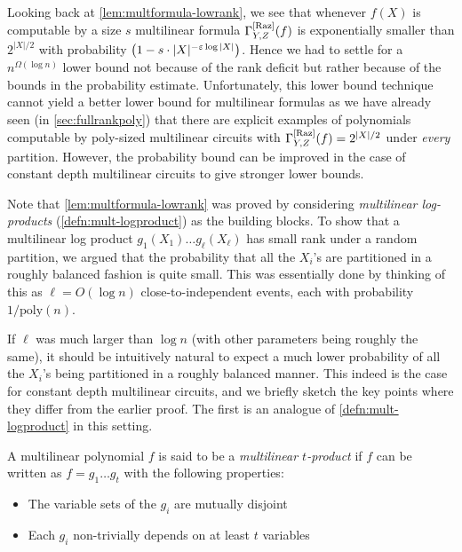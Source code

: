Looking back at \autoref{lem:multformula-lowrank}, we see that whenever $f(X)$ is computable by a size $s$ multilinear formula $\Gamma^{\mathrm{[Raz]}}_{Y,Z}(f)$ is exponentially smaller than $2^{|X|/2}$ with probability $\left(1 - s\cdot |X|^{-\varepsilon \log |X|}\right)$. 
Hence we had to settle for a $n^{\Omega(\log n)}$ lower bound not because of the rank deficit but rather because of the bounds in the probability estimate. 
Unfortunately, this lower bound technique cannot yield a better lower bound for multilinear formulas as we have already seen (in \autoref{sec:fullrankpoly}) that there are explicit examples of polynomials computable by poly-sized multilinear circuits with $\Gamma^{\mathrm{[Raz]}}_{Y,Z}(f) = 2^{|X|/2}$ under \emph{every} partition. 
However, the probability bound can be improved in the case of constant depth multilinear circuits to give stronger lower bounds. 


Note that \autoref{lem:multformula-lowrank} was proved by considering \emph{multilinear log-products} (\autoref{defn:mult-logproduct}) as the building blocks. 
To show that a multilinear log product $g_1(X_1)\dots g_{\ell}(X_\ell)$ has small rank under a random partition, we argued that the probability that all the $X_i$'s are partitioned in a roughly balanced fashion is quite small. 
This was essentially done by thinking of this as $\ell = O(\log n)$ close-to-independent events, each with probability $1/\mathrm{poly}(n)$. 

If $\ell$ was much larger than $\log n$ (with other parameters being roughly the same), it should be intuitively natural to expect a much lower probability of all the $X_i$'s being partitioned in a roughly balanced manner. 
This indeed is the case for constant depth multilinear circuits, and we briefly sketch the key points where they differ from the earlier proof. 
The first is an analogue of \autoref{defn:mult-logproduct} in this setting. 

\begin{definition}\label{defn:mult-t-prod}
A multilinear polynomial $f$ is said to be a \emph{multilinear $t$-product} if $f$ can be written as $f = g_1\dots g_t$ with the following properties:
\begin{itemize}
\item The variable sets of the $g_i$ are mutually disjoint
\item Each $g_i$ non-trivially depends on at least $t$ variables
\end{itemize}
\end{definition}

